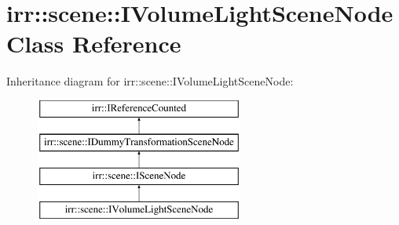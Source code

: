 \hypertarget{classirr_1_1scene_1_1IVolumeLightSceneNode}{}\section{irr\+:\+:scene\+:\+:I\+Volume\+Light\+Scene\+Node Class Reference}
\label{classirr_1_1scene_1_1IVolumeLightSceneNode}
Inheritance diagram for irr\+:\+:scene\+:\+:I\+Volume\+Light\+Scene\+Node\+:\begin{figure}[H]
\begin{center}
\leavevmode
\includegraphics[height=4.000000cm]{classirr_1_1scene_1_1IVolumeLightSceneNode}
\end{center}
\end{figure}
